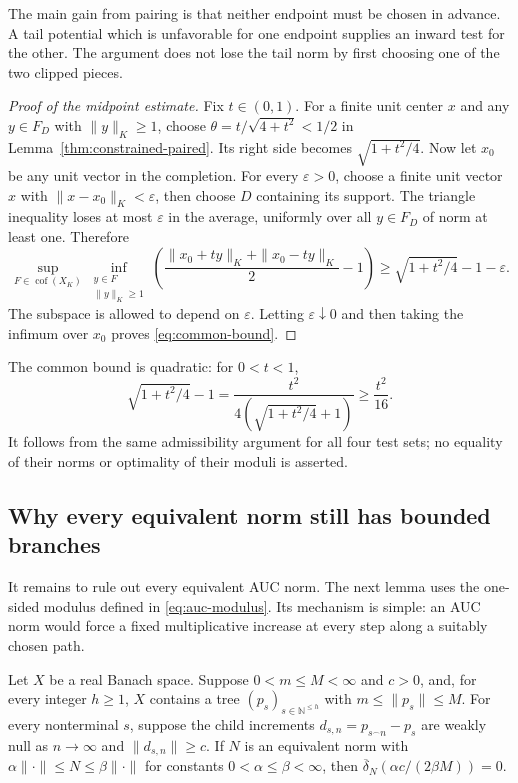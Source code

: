 The main gain from pairing is that neither endpoint must be chosen in
advance. A tail potential which is unfavorable for one endpoint supplies
an inward test for the other. The argument does not lose the tail norm
by first choosing one of the two clipped pieces.



\begin{proof}[Proof of the midpoint estimate]
Fix $t\in(0,1)$. For a finite unit center $x$ and any $y\in F_D$ with
$\|y\|_K\ge1$, choose
$\theta=t/\sqrt{4+t^2}<1/2$ in Lemma~\ref{thm:constrained-paired}. Its right
side becomes $\sqrt{1+t^2/4}$. Now let $x_0$ be any unit vector in the
completion. For every $\varepsilon>0$, choose a finite unit vector $x$
with $\|x-x_0\|_K<\varepsilon$, then choose $D$ containing its support.
The triangle inequality loses at most $\varepsilon$ in the average,
uniformly over all $y\in F_D$ of norm at least one. Therefore
\[
 \sup_{F\in\operatorname{cof}(X_K)}\inf_{\substack{y\in F\\\|y\|_K\ge1}}
 \left(\frac{\|x_0+ty\|_K+\|x_0-ty\|_K}{2}-1\right)
 \ge\sqrt{1+t^2/4}-1-\varepsilon.
\]
The subspace is allowed to depend on $\varepsilon$. Letting
$\varepsilon\downarrow0$ and then taking the infimum over $x_0$ proves
\eqref{eq:common-bound}.
\end{proof}

The common bound is quadratic: for $0<t<1$,
\[
 \sqrt{1+t^2/4}-1
 =\frac{t^2}{4(\sqrt{1+t^2/4}+1)}\ge\frac{t^2}{16}.
\]
It follows from the same admissibility argument for all four test sets;
no equality of their norms or optimality of their moduli is asserted.


\subsection{Why every equivalent norm still has bounded branches}

It remains to rule out every equivalent AUC norm. The next lemma
uses the one-sided modulus defined in \eqref{eq:auc-modulus}. Its mechanism
is simple: an AUC norm would force a fixed multiplicative increase at
every step along a suitably chosen path.

\begin{lemma}\label{lem:bounded-tree}
Let $X$ be a real Banach space. Suppose $0<m\le M<\infty$ and
$c>0$, and, for every integer $h\ge1$, $X$ contains a tree
$(p_s)_{s\in\mathbb N^{\le h}}$ with $m\le\|p_s\|\le M$.
For every nonterminal $s$, suppose the child increments
$d_{s,n}=p_{s^\frown n}-p_s$ are weakly null as $n\to\infty$ and
$\|d_{s,n}\|\ge c$. If $N$ is an equivalent norm with
$\alpha\|\cdot\|\le N\le\beta\|\cdot\|$ for constants
$0<\alpha\le\beta<\infty$, then
$\overline\delta_N(\alpha c/(2\beta M))=0$.
\end{lemma}

